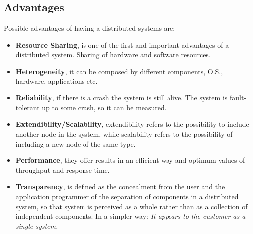 \documentclass[11pt,a4paper]{article}
\begin{document}
\subsection{Advantages}
Possible advantages of having a distributed systems are:
\begin{itemize}
	\item \textbf{Resource Sharing}, is one of the first and important advantages of a distributed system. Sharing of hardware and software resources. 
	\item \textbf{Heterogeneity}, it can be composed by different components, O.S., hardware, applications etc.
	\item \textbf{Reliability}, if there is a crash the system is still alive. The system is fault-tolerant up to some crash, so it can be measured.
	\item \textbf{Extendibility/Scalability}, extendibility refers to the possibility to include another node in the system, while scalability refers to the possibility of including a new node of the same type.
	\item \textbf{Performance}, they offer results in an efficient way and optimum values of throughput and response time.
	\item \textbf{Transparency}, is defined as the concealment from the user and the application programmer of the separation of components in a distributed system, so that system is perceived as a whole rather than as a collection of independent components. In a simpler way: \textit{It appears to the customer as a single system.}
\end{itemize}
\end{document}
